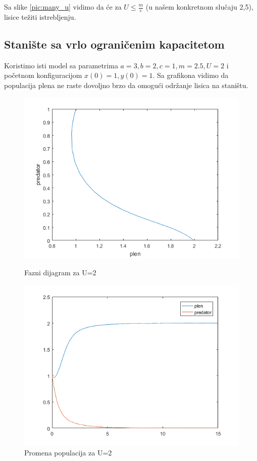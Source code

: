 \documentclass[a4paper]{article}
\begin{document}
Sa slike \ref{pic:many_u} vidimo da će za $U\leq\frac{m}{c}$
(u našem konkretnom slučaju 2,5),
lisice težiti istrebljenju.

\subsection{Stanište sa vrlo ograničenim kapacitetom}
\label{sub:log_mod_ogr}

Koristimo isti model sa parametrima $a=3, b=2, c=1, m=2.5, U=2$
i početnom konfiguracijom $x(0)=1, y(0)=1$.
Sa grafikona vidimo da populacija plena ne raste dovoljno brzo da omogući
održanje lisica na staništu.

\begin{figure}[H]
    \centering
    \begin{minipage}{0.45\textwidth}
        \centering
        \includegraphics[width=1\textwidth]{images/lv_low_u_phase} %
        \caption{Fazni dijagram za U=2}
    \end{minipage}\hfill
    \begin{minipage}{0.45\textwidth}
        \centering
        \includegraphics[width=1\textwidth]{images/lv_low_u_time} %
        \caption{Promena populacija za U=2}
    \end{minipage}
\end{figure}
\end{document}
